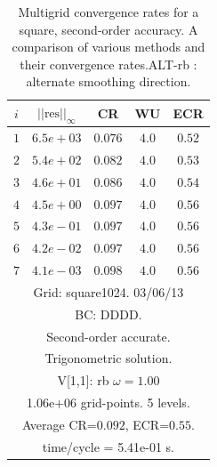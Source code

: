 \begin{table}[hbt]
\begin{center}
{\begin{tabular}{|c|c|c|c|c|} \hline 
 $i$   & $\vert\vert\mbox{res}\vert\vert_\infty$  &  CR     &  WU    & ECR  \\   \hline 
 $ 1$  & $ 6.5e+03$ & $0.076$ & $ 4.0$ & $0.52$ \\ 
 $ 2$  & $ 5.4e+02$ & $0.082$ & $ 4.0$ & $0.53$ \\ 
 $ 3$  & $ 4.6e+01$ & $0.086$ & $ 4.0$ & $0.54$ \\ 
 $ 4$  & $ 4.5e+00$ & $0.097$ & $ 4.0$ & $0.56$ \\ 
 $ 5$  & $ 4.3e-01$ & $0.097$ & $ 4.0$ & $0.56$ \\ 
 $ 6$  & $ 4.2e-02$ & $0.097$ & $ 4.0$ & $0.56$ \\ 
 $ 7$  & $ 4.1e-03$ & $0.098$ & $ 4.0$ & $0.56$ \\ 
\hline 
\multicolumn{5}{|c|}{Grid: square1024. 03/06/13}  \\
\multicolumn{5}{|c|}{BC: DDDD.}  \\
\multicolumn{5}{|c|}{Second-order accurate.}  \\
\multicolumn{5}{|c|}{Trigonometric solution.}  \\
\multicolumn{5}{|c|}{V[1,1]: rb $\omega=1.00$}  \\
\multicolumn{5}{|c|}{1.06e+06 grid-points. 5 levels.}  \\
\multicolumn{5}{|c|}{Average CR=$0.092$, ECR=$0.55$.}  \\
\multicolumn{5}{|c|}{time/cycle = 5.41e-01 s.}  \\
\hline 
\end{tabular}
} %
\end{center}
\caption{Multigrid convergence rates for a square, second-order accuracy. A comparison of various methods and
their convergence rates.ALT-rb : alternate smoothing direction. }
\label{fig:squareSecondOrder2D} 
\end{table}





